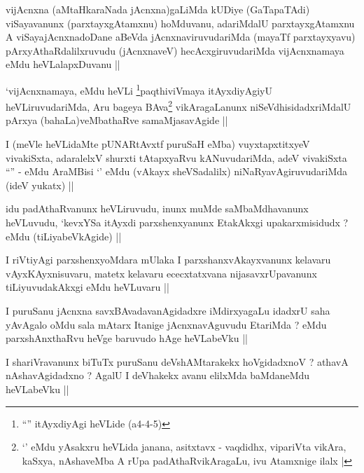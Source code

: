 \begin{artha}
vijAcnxna (aMtaHkaraNada jAcnxna)gaLiMda kUDiye (GaTapaTAdi) viSayavanunx (parxtayxgAtamxnu) hoMduvanu, adariMdalU parxtayxgAtamxnu A viSayajAcnxnadoDane aBeVda jAcnxnaviruvudariMda (mayaTf parxtayxyavu) pArxyAthaRdalilxruvudu (jAcnxnaveV) hecAcxgiruvudariMda vijAcnxnamaya eMdu heVLalapxDuvanu ||
\end{artha}

\begin{artha}
`vijAcnxnamaya, eMdu heVLi \footnote{``\stext'' itAyxdiyAgi heVLide (a4-4-5)}paqthiviVmaya itAyxdiyAgiyU heVLiruvudariMda, Aru bageya BAva\footnote{`\stext' eMdu yAsakxru heVLida janana, asitxtavx - vaqdidhx, vipariVta vikAra, kaSxya, nAshaveMba A rUpa padAthaRvikAragaLu, ivu Atamxnige ilalx |} vikAragaLanunx niSeVdhisidadxriMdalU pArxya (bahaLa)veMbathaRve samaMjasavAgide ||
\end{artha}


\begin{artha}
I (meVle heVLidaMte pUNARtAvxtf puruSaH eMba) vuyxtapxtitxyeV vivakiSxta, adaralelxV shurxti tAtapxyaRvu kANuvudariMda, adeV vivakiSxta ``\stext'' - eMdu AraMBisi `\stext' eMdu (vAkayx sheVSadalilx) niNaRyavAgiruvudariMda (ideV yukatx) ||
\end{artha}

\begin{artha}
idu padAthaRvanunx heVLiruvudu, inunx muMde saMbaMdhavanunx heVLuvudu, `kevxYSa itAyxdi parxshenxyanunx EtakAkxgi upakarxmisidudx ? eMdu (tiLiyabeVkAgide) ||
\end{artha}

\begin{artha}
I riVtiyAgi parxshenxyoMdara mUlaka I parxshanxvAkayxvanunx kelavaru vAyxKAyxnisuvaru, matetx kelavaru ececxtatxvana nijasavxrUpavanunx tiLiyuvudakAkxgi eMdu heVLuvaru ||
\end{artha}

\begin{artha}
I puruSanu jAcnxna savxBAvadavanAgidadxre iMdirxyagaLu idadxrU saha yAvAgalo oMdu sala mAtarx Itanige jAcnxnavAguvudu EtariMda ? eMdu parxshAnxthaRvu heVge baruvudo hAge heVLabeVku ||
\end{artha}

\begin{artha}
I shariVravanunx biTuTx puruSanu deVshAMtarakekx hoVgidadxnoV ? athavA nAshavAgidadxno ? AgalU I deVhakekx avanu elilxMda baMdaneMdu heVLabeVku ||
\end{artha}

